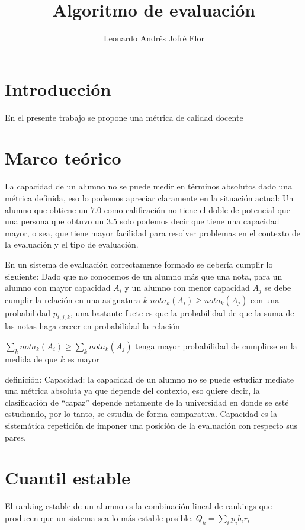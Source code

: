 \documentclass{article}
\author{Leonardo Andrés Jofré Flor}
\title{Algoritmo de evaluación}
\begin{document}
\maketitle

\section{Introducción}
En el presente trabajo se propone una métrica de calidad docente


\section{Marco teórico}
La capacidad de un alumno no se puede medir en términos absolutos dado una
métrica definida, eso lo podemos apreciar claramente en la situación actual: Un
alumno que obtiene un $7.0$ como calificación no tiene el doble de potencial que
una persona que obtuvo un $3.5$ solo podemos decir que tiene una capacidad
mayor, o sea, que tiene mayor facilidad para resolver problemas en el contexto
de la evaluación y el tipo de evaluación.

En un sistema de evaluación correctamente formado se debería cumplir lo
siguiente: Dado que no conocemos de un alumno más que una nota, para un alumno
con mayor capacidad $A_i$ y un alumno con menor capacidad $A_j$ se debe cumplir
la relación en una asignatura $k$
$nota_k(A_i)\geq nota_k(A_j)$ con una probabilidad $p_{i,j,k}$, una bastante
fuete es que la probabilidad de que la suma de las notas haga crecer en
probabilidad la relación

$\sum_k nota_k(A_i)\geq \sum_k nota_k(A_j)$ tenga mayor probabilidad de
cumplirse en la medida de que $k$ es mayor

definición: Capacidad: la capacidad de un alumno no se puede estudiar mediate
una métrica absoluta ya que depende del contexto, eso quiere decir, la
clasificación de ``capaz'' depende netamente de la universidad en donde se esté
estudiando, por lo tanto, se estudia de forma comparativa.
Capacidad es la sistemática repetición de imponer una posición de la evaluación
con respecto sus pares.

\section{Cuantil estable}
El ranking estable de un alumno es la combinación lineal de rankings que
producen que un sistema sea lo más estable posible.
$Q_k = \sum_i p_i b_i r_i$
\end{document}
